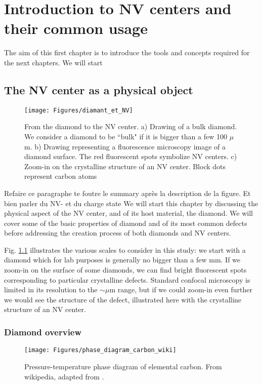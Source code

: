\documentclass[a4paper,11pt]{report}
\title{}
\begin{document}
\chapter{Introduction to NV centers and their common usage}
The aim of this first chapter is to introduce the tools and concepts required for the next chapters. We will start

\section{The NV center as a physical object}
\begin{figure}[h!]
\centering
\texttt{[image: Figures/diamant\_et\_NV]}
\caption{From the diamond to the NV center. a) Drawing of a bulk diamond. We consider a diamond to be ``bulk" if it is bigger than a few 100 $\mu$m. b) Drawing representing a fluorescence microscopy image of a diamond surface. The red fluorescent spots symbolize NV centers. c) Zoom-in on the crystalline structure of an NV center. Block dots represent carbon atoms}
\label{diamond+NV}
\end{figure}
Refaire ce paragraphe te foutre le summary après la description de la figure. Et bien parler du NV- et du charge state
We will start this chapter by discussing the physical aspect of the NV center, and of its host material, the diamond. We will cover some of the basic properties of diamond and of its most common defects before addressing the creation process of both diamonds and NV centers.

Fig. \ref{diamond+NV} illustrates the various scales to consider in this study: we start with a diamond which for lab purposes is generally no bigger than a few mm. If we zoom-in on the surface of some diamonds, we can find bright fluorescent spots corresponding to particular crystalline defects. Standard confocal microscopy is limited in its resolution to the $\sim \mu$m range, but if we could zoom-in even further we would see the structure of the defect, illustrated here with the crystalline structure of an NV center. 
\subsection{Diamond overview}
\begin{figure}[h!]
\centering
\texttt{[image: Figures/phase\_diagram\_carbon\_wiki]}
\caption{Pressure-temperature phase diagram of elemental carbon. From wikipedia, adapted from \citep{bundy1989pressure, bundy1996pressure}.}
\label{carbon phase diagram}
\end{figure}
\end{document}
